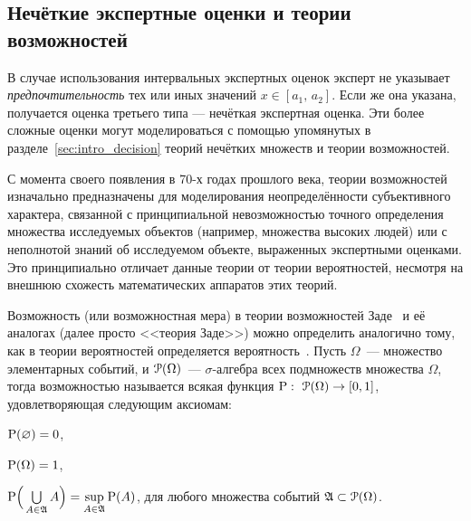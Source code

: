 \subsection{Нечёткие экспертные оценки и теории возможностей}

В случае использования интервальных экспертных оценок эксперт не указывает {\sl предпочтительность} тех или иных значений $x \in [a_1,\, a_2]$. Если же она указана, получается оценка третьего типа --- нечёткая экспертная оценка. Эти более сложные оценки могут моделироваться с помощью упомянутых в разделе~\ref{sec:intro_decision} теорий нечётких множеств и теории возможностей.


С момента своего появления в 70-х годах прошлого века, теории возможностей изначально предназначены для моделирования неопределённости субъективного характера, связанной с принципиальной невозможностью точного определения множества исследуемых объектов (например, множества высоких людей) или с неполнотой знаний об исследуемом объекте, выраженных экспертными оценками. Это принципиально отличает данные теории от теории вероятностей, несмотря на внешнюю схожесть математических аппаратов этих теорий. 

Возможность (или возможностная мера) в теории возможностей Заде~\cite{citeZadeh} и её аналогах (далее просто <<теория Заде>>) можно определить аналогично тому, как в теории вероятностей определяется вероятность~\cite{dubois_prade-1990}. Пусть $\Omega$~--- множество элементарных событий, и $\Po(\Omega)$~--- $\sigma$-алгебра всех подмножеств множества $\Omega$, тогда 
\label{def_possibility}
возможностью называется всякая функция $\P:\ \Po(\Omega)\to[0,1]$, удовлетворяющая следующим аксиомам:
\begin{compactenum}
\item $\P(\varnothing) = 0$,\label{axiom_P1}
\item $\P(\Omega) = 1$,\label{axiom_P2}
\item $\P\Big(\bigcup\limits_{A\in\Alg} A\Big) = \sup\limits_{A\in\Alg}\P(A)$, для любого множества событий $\Alg\subset\Po(\Omega)$.\label{axiom_P3}
\end{compactenum}

